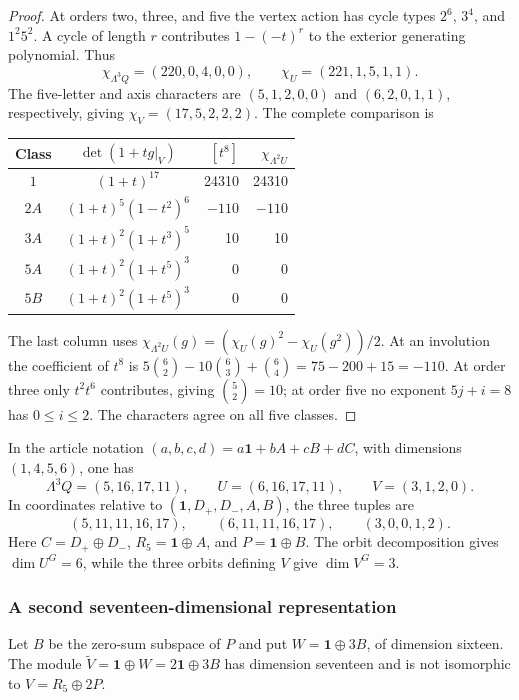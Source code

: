 \documentclass[11pt,a4paper]{article}
\begin{document}
\begin{proof}
At orders two, three, and five the vertex action has cycle types
$2^6$, $3^4$, and $1^2 5^2$. A cycle of length $r$ contributes
$1-(-t)^r$ to the exterior generating polynomial. Thus
\[
\chi_{\Lambda^3Q}=(220,0,4,0,0),\qquad
\chi_U=(221,1,5,1,1).
\]
The five-letter and axis characters are $(5,1,2,0,0)$ and
$(6,2,0,1,1)$, respectively, giving
$\chi_V=(17,5,2,2,2)$. The complete comparison is
\begin{center}\small
\begin{tabular}{c|c|r|r}
\toprule
Class&$\det(1+tg|_V)$&$[t^8]$&$\chi_{\Lambda^2U}$\\\midrule
$1$&$(1+t)^{17}$&24310&24310\\
$2A$&$(1+t)^5(1-t^2)^6$&$-110$&$-110$\\
$3A$&$(1+t)^2(1+t^3)^5$&10&10\\
$5A$&$(1+t)^2(1+t^5)^3$&0&0\\
$5B$&$(1+t)^2(1+t^5)^3$&0&0\\\bottomrule
\end{tabular}
\end{center}
The last column uses
$\chi_{\Lambda^2U}(g)=(\chi_U(g)^2-\chi_U(g^2))/2$.
At an involution the coefficient of $t^8$ is
$5\binom62-10\binom63+\binom64=75-200+15=-110$.
At order three only $t^2t^6$ contributes, giving $\binom52=10$;
at order five no exponent $5j+i=8$ has $0\leq i\leq2$.
The characters agree on all five classes.
\end{proof}

In the article notation $(a,b,c,d)=a\mathbf1+bA+cB+dC$, with
dimensions $(1,4,5,6)$, one has
\[
\Lambda^3Q=(5,16,17,11),\qquad
U=(6,16,17,11),\qquad V=(3,1,2,0).
\]
In coordinates relative to $(\mathbf1,D_+,D_-,A,B)$, the three tuples are
\[
(5,11,11,16,17),\qquad (6,11,11,16,17),\qquad (3,0,0,1,2).
\]
Here $C=D_+\oplus D_-$, $R_5=\mathbf1\oplus A$, and
$P=\mathbf1\oplus B$. The orbit decomposition gives
$\dim U^G=6$, while the three orbits defining $V$ give $\dim V^G=3$.

\subsubsection*{A second seventeen-dimensional representation}

Let $B$ be the zero-sum subspace of $P$ and put
$W=\mathbf1\oplus3B$, of dimension sixteen. The module
$\widetilde V=\mathbf1\oplus W=2\mathbf1\oplus3B$ has dimension
seventeen and is not isomorphic to $V=R_5\oplus2P$.
\end{document}
